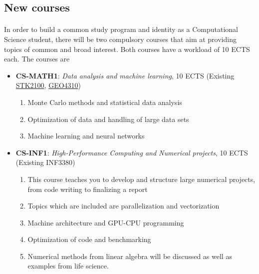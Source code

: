 \documentclass[%
oneside,                 %
final,                   %
10pt]{article}
\begin{document}
\noindent



\subsection*{New courses}

\paragraph{}
In order to build a common study program and identity as a Computational Science student, there will be two compulsory courses that aim at providing topics of common and broad interest.
Both courses have a workload of 10 ECTS each. The courses are

\begin{itemize}
\item \textbf{CS-MATH1}: \emph{Data analysis and machine learning}, 10 ECTS (Existing \href{{http://www.uio.no/studier/emner/matnat/math/STK2100/}}{STK2100}, \href{{http://www.uio.no/studier/emner/matnat/geofag/GEO4310/}}{GEO4310})
\begin{enumerate}

 \item Monte Carlo methods and statistical data analysis

 \item Optimization of data and handling of large data sets

 \item Machine learning and neural networks

\end{enumerate}

\noindent
\item \textbf{CS-INF1}: \emph{High-Performance Computing and Numerical projects}, 10 ECTS (Existing INF3380)
\begin{enumerate}

 \item This course teaches you to develop and structure large numerical projects, from code writing to  finalizing a report

 \item Topics which are included are parallelization and vectorization

 \item Machine architecture and GPU-CPU programming

 \item Optimization of code and benchmarking

 \item Numerical methods from linear algebra will be discussed as well as examples from life science.
\end{enumerate}

\noindent
\end{itemize}
\end{document}
